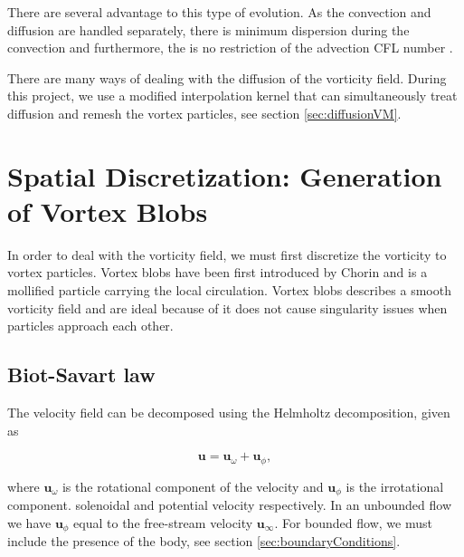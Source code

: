 There are several advantage to this type of evolution. As the convection and diffusion are handled separately, there is minimum dispersion during the convection and furthermore, the is no restriction of the advection CFL number \cite{Wee2006}.

There are many ways of dealing with the diffusion of the vorticity field. During this project, we use a modified interpolation kernel \cite{Wee2006} that can simultaneously treat diffusion and remesh the vortex particles, see section \ref{sec:diffusionVM}.

\section{Spatial Discretization: Generation of Vortex Blobs}
\label{sec:spatialDiscretization}

In order to deal with the vorticity field, we must first discretize the vorticity to vortex particles. Vortex blobs have been first introduced by Chorin and is a mollified particle carrying the local circulation. Vortex blobs describes a smooth vorticity field and are ideal because of it does not cause singularity issues when particles approach each other.

\subsection{Biot-Savart law}

The velocity field can be decomposed using the Helmholtz decomposition, given as

	\begin{equation}
	\mathbf{u} = \mathbf{u}_{\omega} + \mathbf{u}_{\phi},
	\label{eq:helmholtz}
	\end{equation}

where $\mathbf{u}_{\omega}$ is the rotational component of the velocity and $\mathbf{u}_{\phi}$ is the irrotational component. solenoidal and potential velocity respectively. In an unbounded flow we have $\mathbf{u}_{\phi}$ equal to the free-stream velocity $\mathbf{u}_{\infty}$. For bounded flow, we must include the presence of the body, see section \ref{sec:boundaryConditions}.
	
